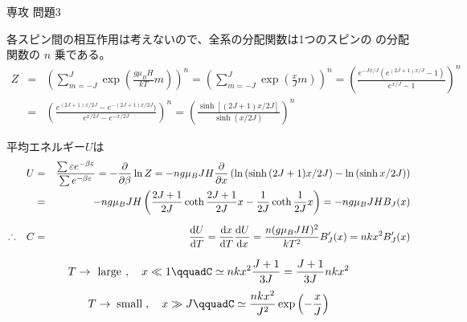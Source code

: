 \documentclass[fleqn]{jbook}
\begin{document}
\begin{answer}{専攻 問題3}{}

\begin{subanswers}
\SubAnswer
  各スピン間の相互作用は考えないので、全系の分配関数は1つのスピンの
  の分配関数の $n$ 乗である。
%
  \begin{eqnarray*}
    Z &=&   \left( \sum_{m=-J}^{J} \exp\left(%
            \frac{g\mu_B H}{kT}m\right) \right)^{n}%
       =    \left( \sum_{m=-J}^{J} \exp\left(%
            \frac{x}{J}m\right) \right)^{n}%
       =  \left( \frac{e^{-Jx/J}(e^{(2J+1)x/J}-1)}%
                 {e^{x/J}-1} \right)^{n} \\
      &=&  \left( \frac{e^{(2J+1)x/2J}-e^{-(2J+1)x/2J})}%
                 {e^{x/2J}-e^{-x/2J}} \right)^{n}%
       =   \left( \frac{\sinh[(2J+1)x/2J]}{\sinh(x/2J)}\right)^{n}
  \end{eqnarray*}



\SubAnswer
  平均エネルギー$U$は
%
  \begin{eqnarray*}
    U &=& \frac{\sum{\varepsilon e^{-\beta \varepsilon}}}%
          {\sum e^{-\beta \varepsilon}}%
       = - \Partial{}{\beta} \ln{Z}%
       = -ng \mu_B JH\Partial{}{x} \left(%
            \ln{(\sinh{(2J+1)x/2J})}-\ln{(\sinh{x/2J})} \right) \\
      &=& -ng \mu_B JH \left(%
           \frac{2J+1}{2J}\coth{\frac{2J+1}{2J}x}%
          -\frac{1}{2J}\coth{\frac{1}{2J}x} \right)%
       =  -ng \mu_B JH B_J(x) \\[2mm]
    \Yueni C &=& \Deriver{U}{T}%
       =  \Deriver{x}{T} \Deriver{U}{x}%
       =  \frac{n(g \mu_B JH)^2}{kT^2}B_J'(x)
       =  nkx^2 B_J'(x)
  \end{eqnarray*}


\SubAnswer
  \[ T \rightarrow \makebox[10mm]{\bf\rm large},\quad x \ll 1 \qquad%
     C \simeq nkx^2 \frac{J+1}{3J}%
       =      \frac{J+1}{3J} nkx^2 \]
  \[ T \rightarrow \makebox[10mm]{\bf\rm small},\quad x \gg J \qquad%
     C \simeq \frac{nkx^2}{J^2}\exp{\left(-\frac{x}{J}\right)} \]
%


\end{subanswers}
\end{answer}
\end{document}
